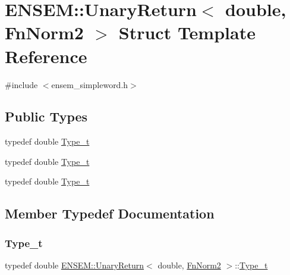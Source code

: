 \hypertarget{structENSEM_1_1UnaryReturn_3_01double_00_01FnNorm2_01_4}{}\section{E\+N\+S\+EM\+:\+:Unary\+Return$<$ double, Fn\+Norm2 $>$ Struct Template Reference}
\label{structENSEM_1_1UnaryReturn_3_01double_00_01FnNorm2_01_4}


{\ttfamily \#include $<$ensem\+\_\+simpleword.\+h$>$}

\subsection*{Public Types}
\begin{DoxyCompactItemize}
\item 
typedef double \mbox{\hyperlink{structENSEM_1_1UnaryReturn_3_01double_00_01FnNorm2_01_4_aedc7475de7c195d2c7597fbf10405b87}{Type\+\_\+t}}
\item 
typedef double \mbox{\hyperlink{structENSEM_1_1UnaryReturn_3_01double_00_01FnNorm2_01_4_aedc7475de7c195d2c7597fbf10405b87}{Type\+\_\+t}}
\item 
typedef double \mbox{\hyperlink{structENSEM_1_1UnaryReturn_3_01double_00_01FnNorm2_01_4_aedc7475de7c195d2c7597fbf10405b87}{Type\+\_\+t}}
\end{DoxyCompactItemize}


\subsection{Member Typedef Documentation}
\mbox{\label{structENSEM_1_1UnaryReturn_3_01double_00_01FnNorm2_01_4_aedc7475de7c195d2c7597fbf10405b87}} 
\subsubsection{\texorpdfstring{Type\_t}{Type\_t}\hspace{0.1cm}{\footnotesize\ttfamily [1/3]}}
{\footnotesize\ttfamily typedef double \mbox{\hyperlink{structENSEM_1_1UnaryReturn}{E\+N\+S\+E\+M\+::\+Unary\+Return}}$<$ double, \mbox{\hyperlink{structENSEM_1_1FnNorm2}{Fn\+Norm2}} $>$\+::\mbox{\hyperlink{structENSEM_1_1UnaryReturn_3_01double_00_01FnNorm2_01_4_aedc7475de7c195d2c7597fbf10405b87}{Type\+\_\+t}}}

